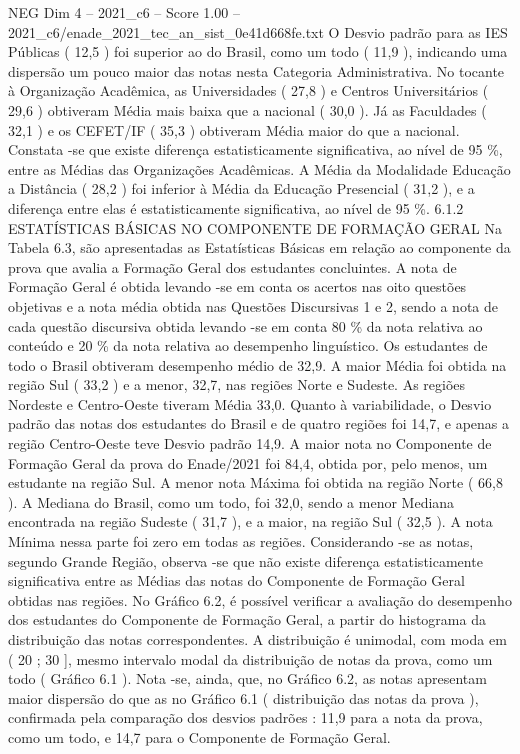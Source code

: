 \begin{textsample}{NEG Dim 4 – 2021\_c6 – Score 1.00 – 2021\_c6/enade\_2021\_tec\_an\_sist\_0e41d668fe.txt}
O Desvio padrão para as IES Públicas ( 12,5 ) foi superior ao do Brasil, como um todo ( 11,9 ), indicando uma dispersão um pouco maior das notas nesta Categoria Administrativa.
No tocante à Organização Acadêmica, as Universidades ( 27,8 ) e Centros Universitários ( 29,6 ) obtiveram Média mais baixa que a nacional ( 30,0 ).
Já as Faculdades ( 32,1 ) e os CEFET/IF ( 35,3 ) obtiveram Média maior do que a nacional.
Constata -se que existe diferença estatisticamente significativa, ao nível de 95 \%, entre as Médias das Organizações Acadêmicas.
A Média da Modalidade Educação a Distância ( 28,2 ) foi inferior à Média da Educação Presencial ( 31,2 ), e a diferença entre elas é estatisticamente significativa, ao nível de 95 \%. 6.1.2 ESTATÍSTICAS BÁSICAS NO COMPONENTE DE FORMAÇÃO GERAL Na Tabela 6.3, são apresentadas as Estatísticas Básicas em relação ao componente da prova que avalia a Formação Geral dos estudantes concluintes.
A nota de Formação Geral é obtida levando -se em conta os acertos nas oito questões objetivas e a nota média obtida nas Questões Discursivas 1 e 2, sendo a nota de cada questão discursiva obtida levando -se em conta 80 \% da nota relativa ao conteúdo e 20 \% da nota relativa ao desempenho linguístico.
Os estudantes de todo o Brasil obtiveram desempenho médio de 32,9.
A maior Média foi obtida na região Sul ( 33,2 ) e a menor, 32,7, nas regiões Norte e Sudeste.
As regiões Nordeste e Centro-Oeste tiveram Média 33,0.
Quanto à variabilidade, o Desvio padrão das notas dos estudantes do Brasil e de quatro regiões foi 14,7, e apenas a região Centro-Oeste teve Desvio padrão 14,9.
A maior nota no Componente de Formação Geral da prova do Enade/2021 foi 84,4, obtida por, pelo menos, um estudante na região Sul.
A menor nota Máxima foi obtida na região Norte ( 66,8 ).
A Mediana do Brasil, como um todo, foi 32,0, sendo a menor Mediana encontrada na região Sudeste ( 31,7 ), e a maior, na região Sul ( 32,5 ).
A nota Mínima nessa parte foi zero em todas as regiões.
Considerando -se as notas, segundo Grande Região, observa -se que não existe diferença estatisticamente significativa entre as Médias das notas do Componente de Formação Geral obtidas nas regiões.
No Gráfico 6.2, é possível verificar a avaliação do desempenho dos estudantes do Componente de Formação Geral, a partir do histograma da distribuição das notas correspondentes.
A distribuição é unimodal, com moda em ( 20 ; 30 ], mesmo intervalo modal da distribuição de notas da prova, como um todo ( Gráfico 6.1 ).
Nota -se, ainda, que, no Gráfico 6.2, as notas apresentam maior dispersão do que as no Gráfico 6.1 ( distribuição das notas da prova ), confirmada pela comparação dos desvios padrões : 11,9 para a nota da prova, como um todo, e 14,7 para o Componente de Formação Geral.

\end{textsample}
